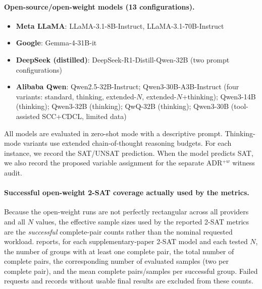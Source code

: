 \documentclass[conference]{IEEEtran}
\theoremstyle{remark}
\begin{document}
\paragraph{Open-source/open-weight models (13 configurations).}
\begin{itemize}[leftmargin=*, itemsep=2pt]
\item \textbf{Meta LLaMA}: LLaMA-3.1-8B-Instruct, LLaMA-3.1-70B-Instruct
\item \textbf{Google}: Gemma-4-31B-it
\item \textbf{DeepSeek (distilled)}: DeepSeek-R1-Distill-Qwen-32B (two prompt configurations)
\item \textbf{Alibaba Qwen}: Qwen2.5-32B-Instruct; Qwen3-30B-A3B-Instruct (four variants: standard, thinking, extended-$N$, extended-$N$+thinking); Qwen3-14B (thinking); Qwen3-32B (thinking); QwQ-32B (thinking); Qwen3-30B (tool-assisted SCC+CDCL, limited data)
\end{itemize}

All models are evaluated in zero-shot mode with a descriptive prompt.
Thinking-mode variants use extended chain-of-thought reasoning budgets.
For each instance, we record the SAT/UNSAT prediction.  When the model predicts SAT, we also record the proposed variable assignment for the separate ADR$^{+w}$ witness audit.

\paragraph{Successful open-weight 2-SAT coverage actually used by the metrics.}
Because the open-weight runs are not perfectly rectangular across all providers and all $N$ values, the effective sample sizes used by the reported 2-SAT metrics are the \emph{successful} complete-pair counts rather than the nominal requested workload.   reports, for each supplementary-paper 2-SAT model and each tested $N$, the number of groups with at least one complete pair, the total number of complete pairs, the corresponding number of evaluated samples (two per complete pair), and the mean complete pairs/samples per successful group.  Failed requests and records without usable final results are excluded from these counts.
\end{document}
